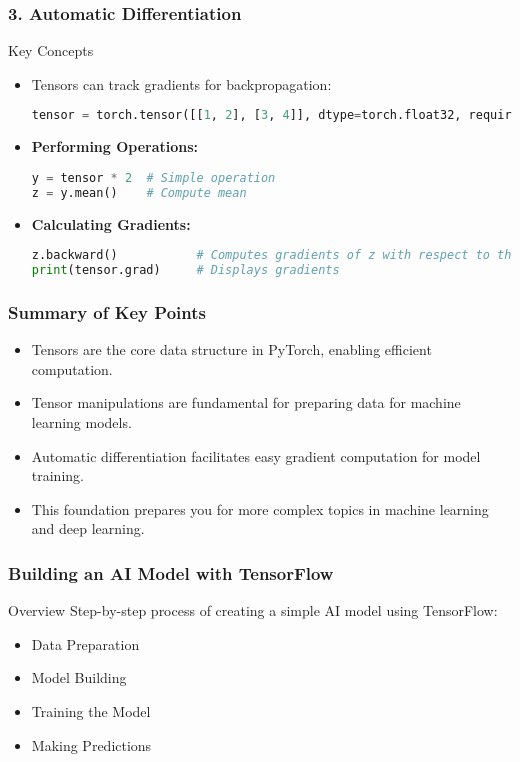 \documentclass[aspectratio=169]{beamer}
\begin{document}
\begin{frame}[fragile]
    \frametitle{3. Automatic Differentiation}
    \begin{block}{Key Concepts}
        \begin{itemize}
            \item Tensors can track gradients for backpropagation:
            \begin{lstlisting}[language=Python]
tensor = torch.tensor([[1, 2], [3, 4]], dtype=torch.float32, requires_grad=True)
            \end{lstlisting}

            \item \textbf{Performing Operations:}
            \begin{lstlisting}[language=Python]
y = tensor * 2  # Simple operation
z = y.mean()    # Compute mean
            \end{lstlisting}

            \item \textbf{Calculating Gradients:}
            \begin{lstlisting}[language=Python]
z.backward()           # Computes gradients of z with respect to the tensor
print(tensor.grad)     # Displays gradients
            \end{lstlisting}
        \end{itemize}
    \end{block}
\end{frame}

\begin{frame}[fragile]
    \frametitle{Summary of Key Points}
    \begin{itemize}
        \item Tensors are the core data structure in PyTorch, enabling efficient computation.
        \item Tensor manipulations are fundamental for preparing data for machine learning models.
        \item Automatic differentiation facilitates easy gradient computation for model training.
        \item This foundation prepares you for more complex topics in machine learning and deep learning.
    \end{itemize}
\end{frame}

\begin{frame}[fragile]
    \frametitle{Building an AI Model with TensorFlow}
    \begin{block}{Overview}
        Step-by-step process of creating a simple AI model using TensorFlow:
        \begin{itemize}
            \item Data Preparation
            \item Model Building
            \item Training the Model
            \item Making Predictions
        \end{itemize}
    \end{block}
\end{frame}
\end{document}
